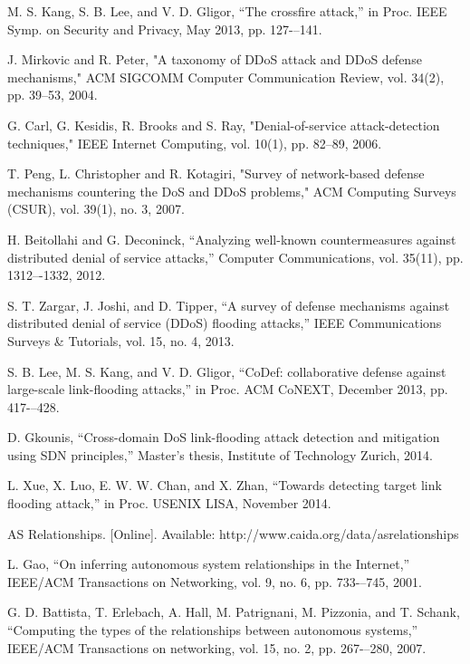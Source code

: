 \newpage
\begin{thebibliography}{99}

M. S. Kang, S. B. Lee, and V. D. Gligor,
“The crossfire attack,”
in Proc. IEEE Symp. on Security and Privacy,
May 2013, pp. 127-–141.

J. Mirkovic and R. Peter,
"A taxonomy of DDoS attack and DDoS defense mechanisms,"
ACM SIGCOMM Computer Communication Review, vol. 34(2), pp. 39--53, 2004.

G. Carl, G. Kesidis, R. Brooks and S. Ray,
"Denial-of-service attack-detection techniques,"
IEEE Internet Computing, vol. 10(1), pp. 82--89, 2006.

T. Peng, L. Christopher and R. Kotagiri,
"Survey of network-based defense mechanisms countering the DoS and DDoS problems,"
ACM Computing Surveys (CSUR), vol. 39(1), no. 3, 2007.

H. Beitollahi and G. Deconinck,
“Analyzing well-known countermeasures against distributed denial of service attacks,”
Computer Communications,
vol. 35(11), pp. 1312–-1332, 2012.

S. T. Zargar, J. Joshi, and D. Tipper,
“A survey of defense mechanisms against distributed denial of service (DDoS) flooding attacks,”
IEEE Communications Surveys \& Tutorials,
vol. 15, no. 4, 2013.

S. B. Lee, M. S. Kang, and V. D. Gligor,
“CoDef: collaborative defense against large-scale link-flooding attacks,”
in Proc. ACM CoNEXT,
December 2013, pp. 417-–428.

D. Gkounis,
“Cross-domain DoS link-flooding attack detection and mitigation using SDN principles,”
Master’s thesis, Institute of Technology Zurich,
2014.

L. Xue, X. Luo, E. W. W. Chan, and X. Zhan,
“Towards detecting target link flooding attack,”
in Proc. USENIX LISA,
November 2014.

AS Relationships. [Online]. Available: http://www.caida.org/data/asrelationships

L. Gao,
“On inferring autonomous system relationships in the Internet,”
IEEE/ACM Transactions on Networking,
vol. 9, no. 6, pp. 733-–745, 2001.

G. D. Battista, T. Erlebach, A. Hall, M. Patrignani, M. Pizzonia, and T. Schank,
“Computing the types of the relationships between autonomous systems,”
IEEE/ACM Transactions on networking, vol. 15,
no. 2, pp. 267-–280, 2007.


\end{thebibliography}
